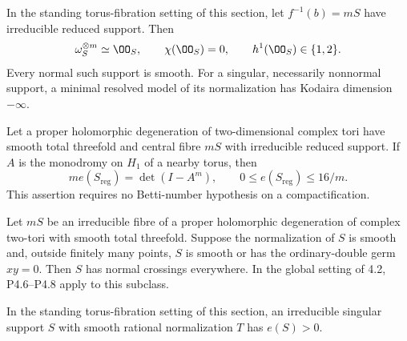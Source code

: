 
\begin{proposition}[P4.12]\hypertarget{tag-02WJ}{}\label{night:P4.12}\label{stmt:P4.12}


In the standing torus-fibration setting of this section, let $f^{-1}(b)=mS$
have irreducible reduced support. Then
\[
 \omega_S^{\otimes m}\simeq\OO_S,\qquad
 \chi(\OO_S)=0,\qquad h^1(\OO_S)\in\{1,2\}.
\]
Every normal such support is smooth. For a singular, necessarily
nonnormal support, a minimal resolved model of its normalization
has Kodaira dimension $-\infty$.
\end{proposition}

\begin{proposition}[P4.13]\hypertarget{tag-02WK}{}\label{night:P4.13}\label{stmt:P4.13}


Let a proper holomorphic degeneration of two-dimensional complex
tori have smooth total threefold and central fibre $mS$ with
irreducible reduced support. If $A$ is the monodromy on $H_1$ of
a nearby torus, then
\[
 m e(S_{\mathrm{reg}})=\det(I-A^m),\qquad
 0\le e(S_{\mathrm{reg}})\le16/m.
\]
This assertion requires no Betti-number hypothesis on a compactification.
\end{proposition}

\begin{proposition}[P4.20]\hypertarget{tag-02WS}{}\label{night:P4.20}\label{stmt:P4.20}


Let $mS$ be an irreducible fibre of a proper holomorphic
degeneration of complex two-tori with smooth total threefold.
Suppose the normalization of $S$ is smooth and, outside
finitely many points, $S$ is smooth or has the ordinary-double
germ $xy=0$. Then $S$ has normal crossings everywhere.
In the global setting of 4.2, P4.6--P4.8 apply to this subclass.
\end{proposition}

\begin{proposition}[P4.21]\hypertarget{tag-02WT}{}\label{night:P4.21}\label{stmt:P4.21}


In the standing torus-fibration setting of this section, an irreducible singular support $S$
with smooth rational normalization $T$ has $e(S)>0$.
\end{proposition}

